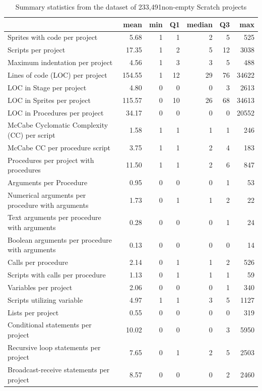 \documentclass{sig-alternate}
\newcommand{\nScriptPrograms}{233,491}
\begin{document}
\begin{table}[ht]
	\centering
	\begin{tabular}{lrrrrrr}
		\hline
		&\textbf{mean}&\textbf{min}&\textbf{Q1}&\textbf{median}&\textbf{Q3}&\textbf{max}\\
		\hline
		Sprites with code per project&5.68&1&1&2&5&525\\
		Scripts per project&17.35&1&2&5&12&3038\\
		Maximum indentation per project&4.56&1&3&3&5&488\\
		Lines of code (LOC) per project&154.55&1&12&29&76&34622\\
		LOC in Stage per project&4.80&0&0&0&3&2613\\
		LOC in Sprites per project&115.57&0&10&26&68&34613\\
		LOC in Procedures per project&34.17&0&0&0&0&20552\\
		McCabe Cyclomatic Complexity (CC) per script&1.58&1&1&1&1&246\\
		McCabe CC per procedure script&3.75&1&1&2&4&183\\
		Procedures per project with procedures&11.50&1&1&2&6&847\\
		Arguments per Procedure&0.95&0&0&0&1&53\\
		Numerical arguments per procedure with arguments&1.73&0&1&1&2&22\\
		Text arguments per procedure with arguments&0.28&0&0&0&1&24\\
		Boolean arguments per procedure with arguments&0.13&0&0&0&0&14\\
		Calls per procedure&2.14&0&1&1&2&526\\
		Scripts with calls per procedure&1.13&0&1&1&1&59\\
		Variables per project&2.06&0&0&0&1&340\\
		Scripts utilizing variable&4.97&1&1&3&5&1127\\
		Lists per project&0.55&0&0&0&0&319\\
		Conditional statements per project&10.02&0&0&0&3&5950\\
		Recursive loop statements per project&7.65&0&1&2&5&2503\\
		Broadcast-receive statements per project&8.57&0&0&0&2&2460\\
		\hline
	\end{tabular}
	\caption{Summary statistics from the dataset of \nScriptPrograms  non-empty Scratch projects}
	\label{tbl-size}
\end{table}
\end{document}
